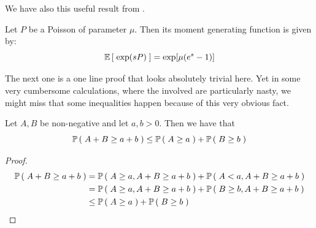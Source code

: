 We have also this useful result from \cite[Equation (1.6-9)]{handbook-poisson}.

\begin{lemma}
	\label{app:Poisson-generating-function}
	Let $P$ be a Poisson \rv of parameter $\mu$.
	Then its moment generating function is given by:
	\begin{equation*}
		\mathbb{E} \left[ \; \exp(sP) \; \right] =  \exp[\mu(e^s-1)]
	\end{equation*}
\end{lemma}

The next one is a one line proof that looks absolutely trivial here. 
Yet in some very cumbersome calculations, where the \rvs involved are particularly nasty, we might miss that some inequalities happen because of this very obvious fact.

\begin{lemma}\label{app:pA-pB-less-than}
	Let $A,B$ be non-negative \rvs and let $a,b > 0$.
	Then we have that
	\begin{equation*}
		\mathbb{P} \left( \; A+B \geq a +b \; \right) \leq \mathbb{P} \left( \; A \geq a \; \right) + \mathbb{P} \left( \; B \geq b \; \right)
	\end{equation*}	
\end{lemma}

\begin{proof}
	\begin{align*}
		\mathbb{P} \left( \; A+B \geq a +b \; \right) &= 
		\mathbb{P} \left( \; A \geq a, A+B \geq a +b \; \right) + \mathbb{P} \left( \; A < a, A+B \geq a +b \; \right) 
		\\
		&=
		\mathbb{P} \left( \; A \geq a, A+B \geq a +b \; \right) + \mathbb{P} \left( \; B \geq b, A+B \geq a +b \; \right) 
		\\
		&\leq
		\mathbb{P} \left( \; A \geq a \; \right) + \mathbb{P} \left( \; B \geq b \; \right)
	\end{align*}	
\end{proof}